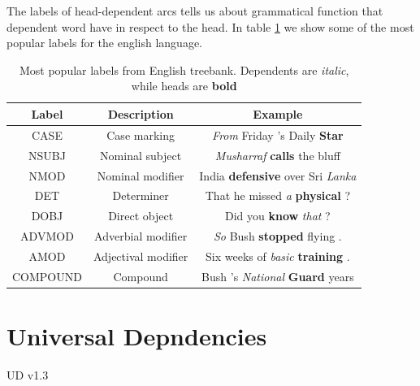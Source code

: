 The labels of head-dependent arcs tells us about grammatical function that
dependent word have in respect to the head. In table \ref{tab:label_samples}
we show some of the most popular labels for the english language.

\begin{table}[!htbp]
    \centering
    \begin{tabular}{c | c | c}
        Label & Description & Example \\ \hline\hline
        CASE & Case marking & \textit{From} Friday 's Daily \textbf{Star} \\
        NSUBJ & Nominal subject & \textit{Musharraf} \textbf{calls} the bluff \\
        NMOD & Nominal modifier & India \textbf{defensive} over Sri \textit{Lanka} \\
        DET & Determiner & That he missed \textit{a} \textbf{physical} ? \\
        DOBJ & Direct object & Did you \textbf{know} \textit{that} ? \\
        ADVMOD & Adverbial modifier & \textit{So} Bush \textbf{stopped} flying . \\
        AMOD & Adjectival modifier & Six weeks of \textit{basic} \textbf{training} . \\
        COMPOUND & Compound & Bush 's \textit{National} \textbf{Guard} years
    \end{tabular}
    \caption{Most popular labels from English treebank. Dependents are \textit{italic},
    while heads are \textbf{bold}}
    \label{tab:label_samples}
\end{table}

\section{Universal Depndencies}
UD v1.3
